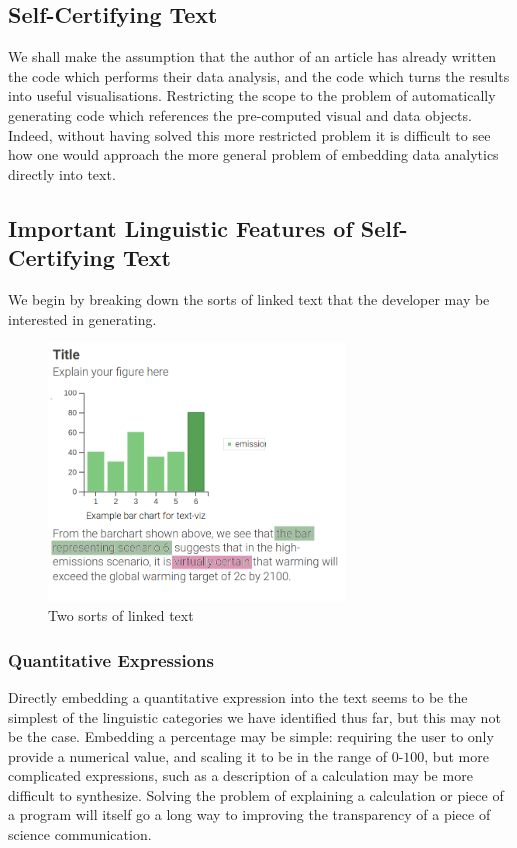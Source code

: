 \subsection{Self-Certifying Text}
We shall make the assumption that the author of an article has already written the code which performs
their data analysis, and the code which turns the results into useful visualisations. Restricting the scope to the problem of
automatically generating code which references the pre-computed visual and data objects.
Indeed, without having solved this more restricted problem it is difficult to see how one would approach
the more general problem of embedding data analytics directly into text.

\subsection{Important Linguistic Features of Self-Certifying Text}
We begin by breaking down the sorts of linked text that the developer may
be interested in generating. 

\begin{figure}
   \includegraphics[width=0.7\textwidth]{fig/text-viz-types.png}
   \caption{Two sorts of linked text}
   \label{fig:linked-text-types}
\end{figure}

\subsubsection{Quantitative Expressions}
Directly embedding a quantitative expression into the text seems to be the simplest
of the linguistic categories we have identified thus far, but this may not be the case. Embedding
a percentage may be simple: requiring the user to only provide a numerical value, and scaling it
to be in the range of $0$-$100$, but more complicated expressions, such as a description of a calculation
may be more difficult to synthesize. Solving the problem of explaining a calculation or piece of a program
will itself go a long way to improving the transparency of a piece of science communication.


